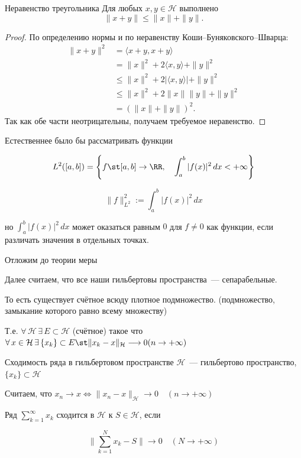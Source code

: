 \begin{Proposition}{Неравенство треугольника}{}
	Для любых $x,y \in \mathcal{H}$ выполнено
	\[
	\|x+y\| \le \|x\| + \|y\|.
	\]
\end{Proposition}

\begin{proof}
	По определению нормы и по неравенству Коши--Буняковского--Шварца:
	\begin{align*}
		\|x+y\|^2
		&= \langle x+y, x+y \rangle \\
		&= \|x\|^2 + 2\langle x,y \rangle + \|y\|^2 \\
		&\le \|x\|^2 + 2|\langle x,y \rangle| + \|y\|^2 \\
		&\le \|x\|^2 + 2\|x\|\|y\| + \|y\|^2 \\
		&= (\|x\| + \|y\|)^2.
	\end{align*}
	Так как обе части неотрицательны, получаем требуемое неравенство.
\end{proof}

\begin{Remark}{}{}
	
	Естественнее было бы рассматривать функции
	
	\[ L^2([a,b]) = \left\{f \st [a,b] \rightarrow \RR, \quad \int_a^b |f(x)|^2\,dx < +\infty \right\} \]
	
	\[ \|f\|^2_{L^2} := \int_a^b |f(x)|^2\,dx \]
	
	но $\int_a^b |f(x)|^2\,dx$ может оказаться равным $0$ для $f \neq 0$ как функции, если различать значения в отдельных точках.
	
	Отложим до теории меры
\end{Remark}

\begin{Remark}{}{}
	
	Далее считаем, что все наши гильбертовы пространства~--- сепарабельные.
	
	То есть существует счётное всюду плотное подмножество. (подмножество, замыкание которого равно всему множеству)
	
	Т.е. $\forall \, \mathcal{H} \, \exists \,  E \subset \mathcal{H}$ (счётное) такое что $\forall \,  x \in \mathcal{H}  \, \exists \,  \{ x_k \} \subset E \st  \|x_k - x\| _{\mathcal{H}} \longrightarrow 0 (n \rightarrow +\infty)$
\end{Remark}

\begin{Definition}{Сходимость ряда в гильбертовом пространстве}{}
	$\mathcal{H}$~--- гильбертово пространство, $\{x_k\} \subset \mathcal{H}$
	
	Считаем, что $x_n \longrightarrow x \Leftrightarrow  \|x_n - x\| _{\mathcal{H}} \longrightarrow 0 \quad (n \rightarrow +\infty)$
	
	Ряд $\sum_{k=1}^\infty x_k$ сходится в $\mathcal{H}$ к $S \in \mathcal{H}$, если
	
	\[  \|\sum_{k=1}^Nx_k - S\|  \longrightarrow 0 \quad (N \rightarrow +\infty) \]
\end{Definition}

